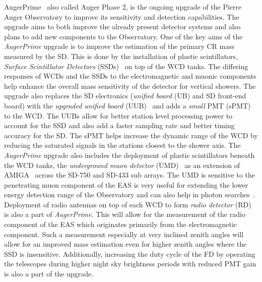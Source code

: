 AugerPrime~\cite{ANASTASI2022167497} also called Auger Phase 2,  is the ongoing upgrade of the Pierre Auger Observatory to improve its sensitivity and detection capabilities. The upgrade aims to both improve the already present detector systems and also plans to add new components to the Observatory. One of the key aims of the \textit{AugerPrime} upgrade is to improve the estimation of the primary CR mass measured by the SD. This is done by the installation of plastic scintillators, \textit{Surface Scintillator Detectors} (SSDs)~\cite{Cataldi:2021uwd} on top of the WCD tanks. The differing responses of WCDs and the SSDs to the electromagnetic and muonic components help enhance the overall mass sensitivity of the detector for vertical showers. The upgrade also replaces the SD electronics (\textit{unified board} (UB) and SD front-end board) with the \textit{upgraded unified board} (UUB)~\cite{PierreAuger:2021nnx} and adds a \textit{small} PMT (sPMT)~\cite{PierreAuger:2023clx} to the WCD. The UUBs allow for better station level processing power to account for the SSD and also add a faster sampling rate and better timing accuracy for the SD. The sPMT helps increase the dynamic range of the WCD by reducing the saturated signals in the stations closest to the shower axis. The \textit{AugerPrime} upgrade also includes the deployment of plastic scintillators beneath the WCD tanks, the \textit{underground muon detector} (UMD)~\cite{AbdulHalim:2023ZF} as an extension of AMIGA~\cite{PierreAuger:2021fhj} across the SD-750 and SD-433 sub arrays. The UMD is sensitive to the penetrating muon component of the EAS is very useful for extending the lower energy detection range of the Observatory and can also help in photon searches~\cite{PierreAuger:2023nkh}. Deployment of radio antennas on top of each WCD to form \textit{radio detector} (RD)~\cite{Horandel:2023XL} is also a part of \textit{AugerPrime}. This will allow for the measurement of the radio component of the EAS which originates primarily from the electromagnetic component. Such a measurement especially at very inclined zenith angles will allow for an improved mass estimation even for higher zenith angles where the SSD is insensitive. Additionally, increasing the duty cycle of the FD by operating the telescopes during higher night sky brightness periods with reduced PMT gain is also a part of the upgrade. 

